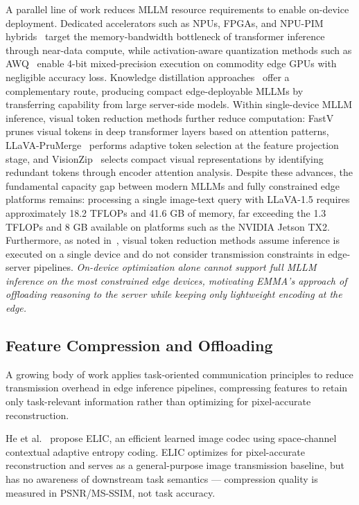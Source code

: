 A parallel line of work reduces MLLM resource requirements to enable on-device deployment.
Dedicated accelerators such as NPUs, FPGAs, and NPU-PIM hybrids~\cite{p3llm,motoyama2024iedm}
target the memory-bandwidth bottleneck of transformer inference through near-data compute,
while activation-aware quantization methods such as AWQ~\cite{lin2024awq} enable 4-bit
mixed-precision execution on commodity edge GPUs with negligible accuracy loss. Knowledge
distillation approaches~\cite{yao2024gkt,yao2025efficient} offer a complementary route,
producing compact edge-deployable MLLMs by transferring capability from large server-side
models. Within single-device MLLM inference, visual token reduction methods further reduce
computation: FastV~\cite{chen2024fastv} prunes visual tokens in deep transformer layers
based on attention patterns, LLaVA-PruMerge~\cite{shang2024llavaprumerge} performs adaptive
token selection at the feature projection stage, and VisionZip~\cite{yang2024visionzip}
selects compact visual representations by identifying redundant tokens through encoder
attention analysis. Despite these advances, the fundamental capacity gap between modern
MLLMs and fully constrained edge platforms remains: processing a single image-text query
with LLaVA-1.5 requires approximately 18.2 TFLOPs and 41.6 GB of memory, far exceeding
the 1.3 TFLOPs and 8 GB available on platforms such as the NVIDIA Jetson TX2. Furthermore,
as noted in~\cite{yuan2025task}, visual token reduction methods assume inference is executed
on a single device and do not consider transmission constraints in edge-server pipelines.
{\em On-device optimization alone cannot support full MLLM inference on the most constrained
edge devices, motivating EMMA's approach of offloading reasoning to the server while keeping
only lightweight encoding at the edge.}

\subsection{Feature Compression and Offloading}

A growing body of work applies task-oriented communication principles to reduce transmission
overhead in edge inference pipelines, compressing features to retain only task-relevant
information rather than optimizing for pixel-accurate reconstruction.

He et al.~\cite{he2022elic} propose ELIC, an efficient learned image codec using
space-channel contextual adaptive entropy coding. ELIC optimizes for pixel-accurate
reconstruction and serves as a general-purpose image transmission baseline, but has no
awareness of downstream task semantics — compression quality is measured in PSNR/MS-SSIM,
not task accuracy.

